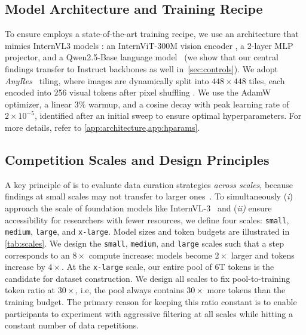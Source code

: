 \subsection{Model Architecture and Training Recipe}\label{modeltrainingrecipe}
To ensure \dcvlm employs a state-of-the-art training recipe, we use an architecture that mimics InternVL3 models \cite{zhu2025internvl3}: an InternViT-300M vision encoder \cite{chen2024expanding}, a 2-layer MLP projector, and a Qwen2.5-Base language model~\citep{qwen25} (we show that our central findings transfer to Instruct backbones as well in~\cref{sec:controls}).
We adopt \textit{AnyRes}~\citep{liu2024llavanext} tiling, where images are dynamically split into $448{\times}448$ tiles, each encoded into 256 visual tokens after pixel shuffling \cite{chen2024expanding,shi2016real}. 
We use the AdamW \cite{loshchilov2017decoupled} optimizer, a linear ${3}{\%}$ warmup, and a cosine decay with peak learning rate of $2\times10^{-5}$, identified after an initial sweep to ensure optimal hyperparameters. 
For more details, refer to \cref{app:architecture,app:hparams}.

\subsection{Competition Scales and Design Principles}\label{sec:scales}




A key principle of \dcvlm is to evaluate data curation strategies \emph{across scales}, because findings at small scales may not transfer to larger ones~\citep{goyal2024scaling,mizrahi2025language,nezhurina2025scaling,maithinking1}.
To simultaneously (\textit{i}) approach the scale of foundation models like InternVL-3~\citep{zhu2025internvl3} and (\textit{ii)} ensure accessibility for researchers with fewer resources, we define four scales: \texttt{small}, \texttt{medium}, \texttt{large}, and \texttt{x-large}.
Model sizes and token budgets are illustrated in \cref{tab:scales}. %
We design the \texttt{small}, \texttt{medium}, and \texttt{large} scales such that a step corresponds to an $8\times$ compute increase: models become $2\times$ larger and tokens increase by $4\times$.
At the \texttt{x-large} scale, our entire pool of 6T tokens is the candidate for dataset construction.
We design all scales to fix pool-to-training token ratio at ${30}{\times}$,
i.e, the pool always contains $30\times$ more tokens than the training budget.
The primary reason for keeping this ratio constant is to enable participants to experiment with aggressive filtering at all scales while hitting a constant number of data repetitions.
 
